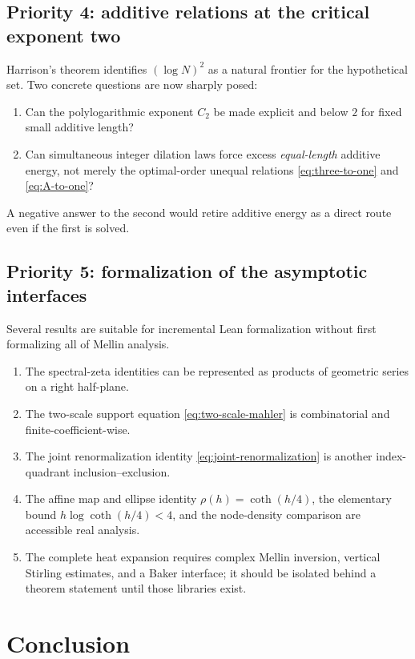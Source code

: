 \documentclass[11pt,oneside]{article}
\theoremstyle{definition}
\theoremstyle{remark}
\begin{document}
\subsection{Priority 4: additive relations at the critical exponent two}

Harrison's theorem identifies $(\log N)^2$ as a natural frontier for the hypothetical set.  Two concrete questions are now sharply posed:
\begin{enumerate}
  \item Can the polylogarithmic exponent $C_2$ be made explicit and below $2$ for fixed small additive length?
  \item Can simultaneous integer dilation laws force excess \emph{equal-length} additive energy, not merely the optimal-order unequal relations \eqref{eq:three-to-one} and \eqref{eq:A-to-one}?
\end{enumerate}
A negative answer to the second would retire additive energy as a direct route even if the first is solved.

\subsection{Priority 5: formalization of the asymptotic interfaces}

Several results are suitable for incremental Lean formalization without first formalizing all of Mellin analysis.
\begin{enumerate}
  \item The spectral-zeta identities can be represented as products of geometric series on a right half-plane.
  \item The two-scale support equation \eqref{eq:two-scale-mahler} is combinatorial and finite-coefficient-wise.
  \item The joint renormalization identity \eqref{eq:joint-renormalization} is another index-quadrant inclusion--exclusion.
  \item The affine map and ellipse identity $\rho(h)=\coth(h/4)$, the elementary bound $h\log\coth(h/4)<4$, and the node-density comparison are accessible real analysis.
  \item The complete heat expansion requires complex Mellin inversion, vertical Stirling estimates, and a Baker interface; it should be isolated behind a theorem statement until those libraries exist.
\end{enumerate}

\section{Conclusion}
\end{document}

